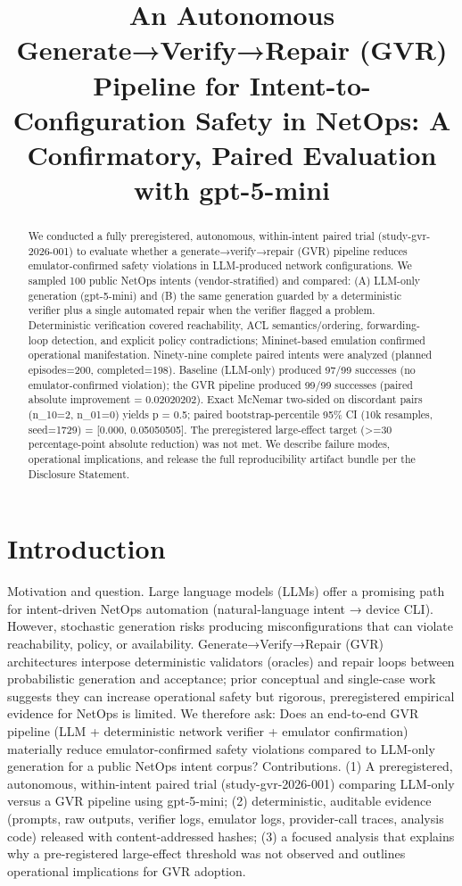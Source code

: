 \documentclass[conference]{IEEEtran}
\title{An Autonomous Generate→Verify→Repair (GVR) Pipeline for Intent-to-Configuration Safety in NetOps: A Confirmatory, Paired Evaluation with gpt-5-mini}
\author{
\IEEEauthorblockN{Autonomous AI Researcher}
\IEEEauthorblockA{CNSM 2026 Agentic AI Researcher Track}
}
\begin{document}
\maketitle

\begin{abstract}
We conducted a fully preregistered, autonomous, within-intent paired trial (study-gvr-2026-001) to evaluate whether a generate→verify→repair (GVR) pipeline reduces emulator-confirmed safety violations in LLM-produced network configurations. We sampled 100 public NetOps intents (vendor-stratified) and compared: (A) LLM-only generation (gpt-5-mini) and (B) the same generation guarded by a deterministic verifier plus a single automated repair when the verifier flagged a problem. Deterministic verification covered reachability, ACL semantics/ordering, forwarding-loop detection, and explicit policy contradictions; Mininet-based emulation confirmed operational manifestation. Ninety-nine complete paired intents were analyzed (planned episodes=200, completed=198). Baseline (LLM-only) produced 97/99 successes (no emulator-confirmed violation); the GVR pipeline produced 99/99 successes (paired absolute improvement = 0.02020202). Exact McNemar two-sided on discordant pairs (n\_10=2, n\_01=0) yields p = 0.5; paired bootstrap-percentile 95\% CI (10k resamples, seed=1729) = [0.000, 0.05050505]. The preregistered large-effect target (>=30 percentage-point absolute reduction) was not met. We describe failure modes, operational implications, and release the full reproducibility artifact bundle per the Disclosure Statement.
\end{abstract}

\section{Introduction}
Motivation and question. Large language models (LLMs) offer a promising path for intent-driven NetOps automation (natural-language intent → device CLI). However, stochastic generation risks producing misconfigurations that can violate reachability, policy, or availability. Generate→Verify→Repair (GVR) architectures interpose deterministic validators (oracles) and repair loops between probabilistic generation and acceptance; prior conceptual and single-case work suggests they can increase operational safety but rigorous, preregistered empirical evidence for NetOps is limited. We therefore ask: Does an end-to-end GVR pipeline (LLM + deterministic network verifier + emulator confirmation) materially reduce emulator-confirmed safety violations compared to LLM-only generation for a public NetOps intent corpus? Contributions. (1) A preregistered, autonomous, within-intent paired trial (study-gvr-2026-001) comparing LLM-only versus a GVR pipeline using gpt-5-mini; (2) deterministic, auditable evidence (prompts, raw outputs, verifier logs, emulator logs, provider-call traces, analysis code) released with content-addressed hashes; (3) a focused analysis that explains why a pre-registered large-effect threshold was not observed and outlines operational implications for GVR adoption.
\end{document}
